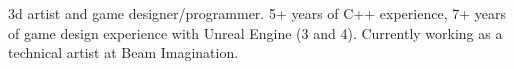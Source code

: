 

\begin{cvparagraph}

3d artist and game designer/programmer. 5+ years of C++ experience, 7+ years of
game design experience with Unreal Engine (3 and 4). Currently working as a 
technical artist at Beam Imagination.
\end{cvparagraph}
